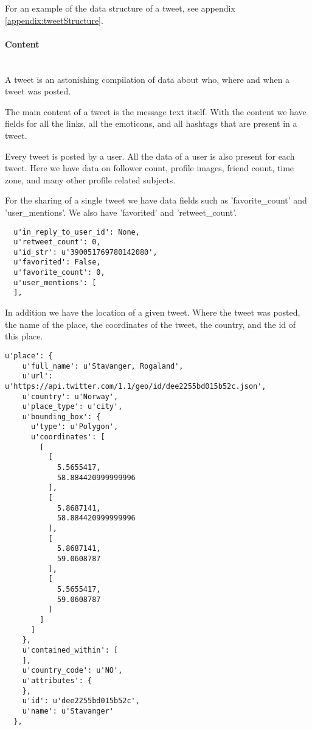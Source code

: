For an example of the data structure of a tweet, see appendix
\ref{appendix:tweetStructure}.

\paragraph{Content}
\hspace{0pt}\\
A tweet is an astonishing compilation of data about who, where and when a tweet
was posted.

The main content of a tweet is the message text itself. With the content we
have fields for all the links, all the emoticons, and all hashtags that are
present in a tweet. 

Every tweet is posted by a user. All the data of a user is also present for
each tweet. Here we have data on follower count, profile images, friend count,
time zone, and many other profile related subjects. 

For the sharing of a single tweet we have data fields such as 'favorite\_count'
and 'user\_mentions'. We also have 'favorited' and 'retweet\_count'. 

\begin{verbatim}
  u'in_reply_to_user_id': None,
  u'retweet_count': 0,
  u'id_str': u'390051769780142080',
  u'favorited': False,
  u'favorite_count': 0,
  u'user_mentions': [      
  ],
\end{verbatim}

In addition we have the location of a given tweet. Where the tweet was posted,
the name of the place, the coordinates of the tweet, the country, and the id of
this place. 

\begin{verbatim}
u'place': {
    u'full_name': u'Stavanger, Rogaland',
    u'url': u'https://api.twitter.com/1.1/geo/id/dee2255bd015b52c.json',
    u'country': u'Norway',
    u'place_type': u'city',
    u'bounding_box': {
      u'type': u'Polygon',
      u'coordinates': [
        [
          [
            5.5655417,
            58.884420999999996
          ],
          [
            5.8687141,
            58.884420999999996
          ],
          [
            5.8687141,
            59.0608787
          ],
          [
            5.5655417,
            59.0608787
          ]
        ]
      ]
    },
    u'contained_within': [
    ],
    u'country_code': u'NO',
    u'attributes': {
    },
    u'id': u'dee2255bd015b52c',
    u'name': u'Stavanger'
  },
\end{verbatim}

